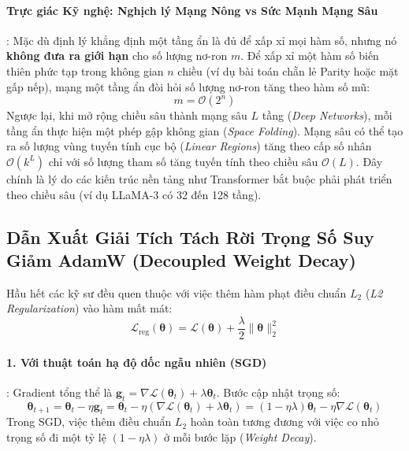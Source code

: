 \paragraph{Trực giác Kỹ nghệ: Nghịch lý Mạng Nông vs Sức Mạnh Mạng Sâu}:
Mặc dù định lý khẳng định một tầng ẩn là đủ để xấp xỉ mọi hàm số, nhưng nó \textbf{không đưa ra giới hạn} cho số lượng nơ-ron $m$. Để xấp xỉ một hàm số biến thiên phức tạp trong không gian $n$ chiều (ví dụ bài toán chẵn lẻ Parity hoặc mặt gấp nếp), mạng một tầng ẩn đòi hỏi số lượng nơ-ron tăng theo hàm số mũ:
\begin{equation}
m = \mathcal{O}(2^n)
\end{equation}
Ngược lại, khi mở rộng chiều sâu thành mạng sâu $L$ tầng (\textit{Deep Networks}), mỗi tầng ẩn thực hiện một phép gập không gian (\textit{Space Folding}). Mạng sâu có thể tạo ra số lượng vùng tuyến tính cục bộ (\textit{Linear Regions}) tăng theo cấp số nhân $\mathcal{O}(k^L)$ chỉ với số lượng tham số tăng tuyến tính theo chiều sâu $\mathcal{O}(L)$. Đây chính là lý do các kiến trúc nền tảng như Transformer bắt buộc phải phát triển theo chiều sâu (ví dụ LLaMA-3 có 32 đến 128 tầng).

\subsection{Dẫn Xuất Giải Tích Tách Rời Trọng Số Suy Giảm AdamW (Decoupled Weight Decay)}
Hầu hết các kỹ sư đều quen thuộc với việc thêm hàm phạt điều chuẩn $L_2$ (\textit{L2 Regularization}) vào hàm mất mát:
\begin{equation}
\mathcal{L}_{\text{reg}}(\boldsymbol{\theta}) = \mathcal{L}(\boldsymbol{\theta}) + \frac{\lambda}{2} \|\boldsymbol{\theta}\|_2^2
\end{equation}

\paragraph{1. Với thuật toán hạ độ dốc ngẫu nhiên (SGD)}:
Gradient tổng thể là $\mathbf{g}_t = \nabla \mathcal{L}(\boldsymbol{\theta}_t) + \lambda \boldsymbol{\theta}_t$. Bước cập nhật trọng số:
\begin{equation}
\boldsymbol{\theta}_{t+1} = \boldsymbol{\theta}_t - \eta \mathbf{g}_t = \boldsymbol{\theta}_t - \eta \left( \nabla \mathcal{L}(\boldsymbol{\theta}_t) + \lambda \boldsymbol{\theta}_t \right) = (1 - \eta \lambda) \boldsymbol{\theta}_t - \eta \nabla \mathcal{L}(\boldsymbol{\theta}_t)
\end{equation}
Trong SGD, việc thêm điều chuẩn $L_2$ hoàn toàn tương đương với việc co nhỏ trọng số đi một tỷ lệ $(1 - \eta \lambda)$ ở mỗi bước lặp (\textit{Weight Decay}).

